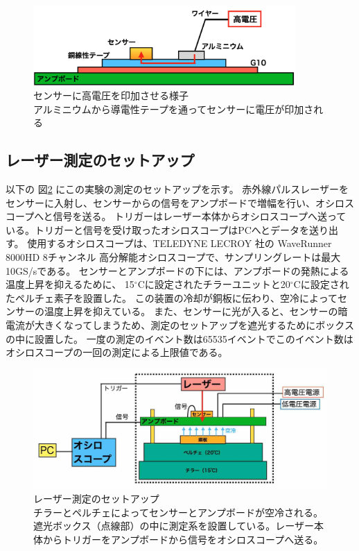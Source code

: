 \begin{figure}[h]
    \centering
    \includegraphics[width=10cm]{fig/ch4/Amp_side.png}
    \caption[センサーに高電圧を印加させる様子]{センサーに高電圧を印加させる様子\\アルミニウムから導電性テープを通ってセンサーに電圧が印加される}
    \label{fg:Amp_side}
\end{figure}

\subsection{レーザー測定のセットアップ}

以下の 図\ref{fg:Laser_setup} にこの実験の測定のセットアップを示す。
赤外線パルスレーザーをセンサーに入射し、センサーからの信号をアンプボードで増幅を行い、オシロスコープへと信号を送る。
トリガーはレーザー本体からオシロスコープへ送っている。トリガーと信号を受け取ったオシロスコープはPCへとデータを送り出す。
使用するオシロスコープは、TELEDYNE LECROY 社の WaveRunner 8000HD 8チャンネル 高分解能オシロスコープで、サンプリングレートは最大10GS/sである。
センサーとアンプボードの下には、アンプボードの発熱による温度上昇を抑えるために、
15${}^\circ$Cに設定されたチラーユニットと20${}^\circ$Cに設定されたペルチェ素子を設置した。
この装置の冷却が銅板に伝わり、空冷によってセンサーの温度上昇を抑えている。
また、センサーに光が入ると、センサーの暗電流が大きくなってしまうため、測定のセットアップを遮光するためにボックスの中に設置した。
一度の測定のイベント数は65535イベントでこのイベント数はオシロスコープの一回の測定による上限値である。

\begin{figure}[h]
    \centering
    \includegraphics[width=14cm]{fig/ch4/Laser_setup.jpg}
    \caption[レーザー測定のセットアップ]{レーザー測定のセットアップ\\チラーとペルチェによってセンサーとアンプボードが空冷される。遮光ボックス（点線部）の中に測定系を設置している。レーザー本体からトリガーをアンプボードから信号をオシロスコープへ送る。}
    \label{fg:Laser_setup}
\end{figure}


